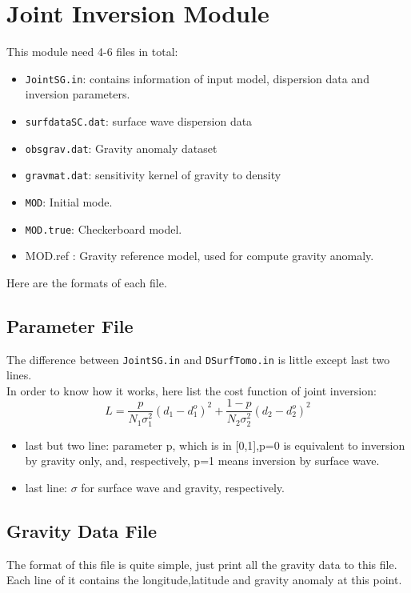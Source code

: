 \documentclass[UTF8]{article}
\begin{document}
    \section{Joint Inversion Module}
    This module need 4-6 files in total:
    \begin{itemize}
        \item \verb!JointSG.in!: contains information of input model, dispersion data and inversion parameters.
        \item \verb!surfdataSC.dat!: surface wave dispersion data
        \item \verb!obsgrav.dat!: Gravity anomaly dataset
        \item \verb!gravmat.dat!: sensitivity kernel of gravity to density
        \item \verb!MOD!: Initial mode.
        \item \verb!MOD.true!: Checkerboard model.
        \item MOD.ref : Gravity reference model, used for compute gravity anomaly.
    \end{itemize}
    Here are the formats of each file.

    \subsection{Parameter File}
    The difference between \verb!JointSG.in! and \verb!DSurfTomo.in! is little except
    last two lines.\\


    In order to know how it works, here list the cost function of joint inversion:
    \[
        L = \frac{p}{N_1 \sigma_1^2} (d_1- d_1^o)^2 + 
            \frac{1-p}{N_2 \sigma_2^2} (d_2- d_2^o)^2 \tag{1}
    \]
    \begin{itemize}
        \item last but two line: parameter p, which is in [0,1],p=0 is equivalent to 
                                inversion by gravity only, and, respectively, p=1 means 
                                inversion by surface wave.
        \item last line: $\sigma$ for surface wave and gravity, respectively.
    \end{itemize}

    \subsection{Gravity Data File}
    The format of this file is quite simple, just print all the gravity data to this file.
    Each line of it contains the longitude,latitude and gravity anomaly at this point. \\
\end{document}
